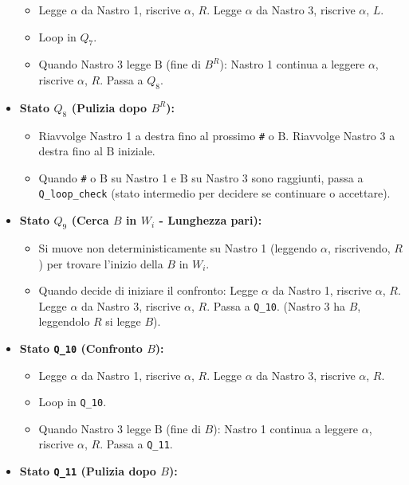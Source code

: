 \documentclass[a4paper, 11pt]{book} %
\theoremstyle{definition}
\newcommand{\B}{\text{B}} %
\begin{document}
\begin{itemize}
\begin{itemize}
            \item Legge $\alpha$ da Nastro 1, riscrive $\alpha$, $R$. Legge $\alpha$ da Nastro 3, riscrive $\alpha$, $L$.
            \item Loop in $Q_7$.
            \item Quando Nastro 3 legge $\B$ (fine di $B^R$): Nastro 1 continua a leggere $\alpha$, riscrive $\alpha$, $R$. Passa a $Q_8$.
        \end{itemize}
    \item \textbf{Stato $Q_8$ (Pulizia dopo $B^R$):}
        \begin{itemize}
            \item Riavvolge Nastro 1 a destra fino al prossimo \texttt{\#} o $\B$. Riavvolge Nastro 3 a destra fino al $\B$ iniziale.
            \item Quando \texttt{\#} o $\B$ su Nastro 1 e $\B$ su Nastro 3 sono raggiunti, passa a \texttt{Q\_{loop\_check}} (stato intermedio per decidere se continuare o accettare).
        \end{itemize}
    \item \textbf{Stato $Q_9$ (Cerca $B$ in $W_i$ - Lunghezza pari):}
        \begin{itemize}
            \item Si muove non deterministicamente su Nastro 1 (leggendo $\alpha$, riscrivendo, $R$) per trovare l'inizio della $B$ in $W_i$.
            \item Quando decide di iniziare il confronto: Legge $\alpha$ da Nastro 1, riscrive $\alpha$, $R$. Legge $\alpha$ da Nastro 3, riscrive $\alpha$, $R$. Passa a \texttt{Q\_{10}}.
            (Nastro 3 ha $B$, leggendolo $R$ si legge $B$).
        \end{itemize}
    \item \textbf{Stato \texttt{Q\_{10}} (Confronto $B$):}
        \begin{itemize}
            \item Legge $\alpha$ da Nastro 1, riscrive $\alpha$, $R$. Legge $\alpha$ da Nastro 3, riscrive $\alpha$, $R$.
            \item Loop in \texttt{Q\_{10}}.
            \item Quando Nastro 3 legge $\B$ (fine di $B$): Nastro 1 continua a leggere $\alpha$, riscrive $\alpha$, $R$. Passa a \texttt{Q\_{11}}.
        \end{itemize}
    \item \textbf{Stato \texttt{Q\_{11}} (Pulizia dopo $B$):}
        \begin{itemize}

\end{itemize}
\end{itemize}
\end{document}
